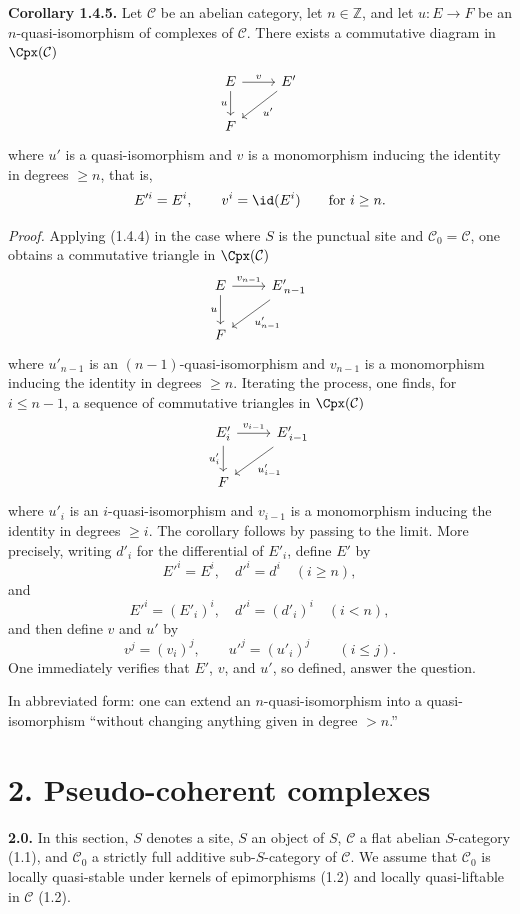 \textbf{Corollary 1.4.5.} Let \(\mathcal C\) be an abelian category, let \(n\in\mathbb Z\), and let \(u:E\to F\) be an \(n\)-quasi-isomorphism of complexes of \(\mathcal C\). There exists a commutative diagram in \(\Cpx(\mathcal C)\)
\[
\begin{tikzcd}
E \arrow[r,"v"] \arrow[d,"u"'] & E' \arrow[dl,"u'"]\\
F &
\end{tikzcd}
\]
where \(u'\) is a quasi-isomorphism and \(v\) is a monomorphism inducing the identity in degrees \(\geq n\), that is,
\[
  E'^i=E^i,\qquad v^i=\id(E^i)\qquad\text{for }i\geq n.
\]

\emph{Proof.} Applying (1.4.4) in the case where \(S\) is the punctual site and \(\mathcal C_0=\mathcal C\), one obtains a commutative triangle in \(\Cpx(\mathcal C)\)
\[
\begin{tikzcd}
E \arrow[r,"v_{n-1}"] \arrow[d,"u"'] & E'_{\,n-1} \arrow[dl,"u'_{n-1}"]\\
F &
\end{tikzcd}
\]
where \(u'_{n-1}\) is an \((n-1)\)-quasi-isomorphism and \(v_{n-1}\) is a monomorphism inducing the identity in degrees \(\geq n\). Iterating the process, one finds, for \(i\leq n-1\), a sequence of commutative triangles in \(\Cpx(\mathcal C)\)
\[
\begin{tikzcd}
E'_i \arrow[r,"v_{i-1}"] \arrow[d,"u'_i"'] & E'_{\,i-1} \arrow[dl,"u'_{i-1}"]\\
F &
\end{tikzcd}
\]
where \(u'_i\) is an \(i\)-quasi-isomorphism and \(v_{i-1}\) is a monomorphism inducing the identity in degrees \(\geq i\). The corollary follows by passing to the limit. More precisely, writing \(d'_i\) for the differential of \(E'_i\), define \(E'\) by
\[
  E'^i=E^i,\quad d'^i=d^i\quad (i\geq n),
\]
and
\[
  E'^i=(E'_i)^i,\quad d'^i=(d'_i)^i\quad (i<n),
\]
and then define \(v\) and \(u'\) by
\[
  v^j=(v_i)^j,\qquad u'^j=(u'_i)^j\qquad (i\leq j).
\]
One immediately verifies that \(E'\), \(v\), and \(u'\), so defined, answer the question.

In abbreviated form: one can extend an \(n\)-quasi-isomorphism into a quasi-isomorphism ``without changing anything given in degree \(>n\).''

\section*{2. Pseudo-coherent complexes}

\textbf{2.0.} In this section, \(S\) denotes a site, \(S\) an object of \(S\), \(\mathcal C\) a flat abelian \(S\)-category (1.1), and \(\mathcal C_0\) a strictly full additive sub-\(S\)-category of \(\mathcal C\). We assume that \(\mathcal C_0\) is locally quasi-stable under kernels of epimorphisms (1.2) and locally quasi-liftable in \(\mathcal C\) (1.2).

